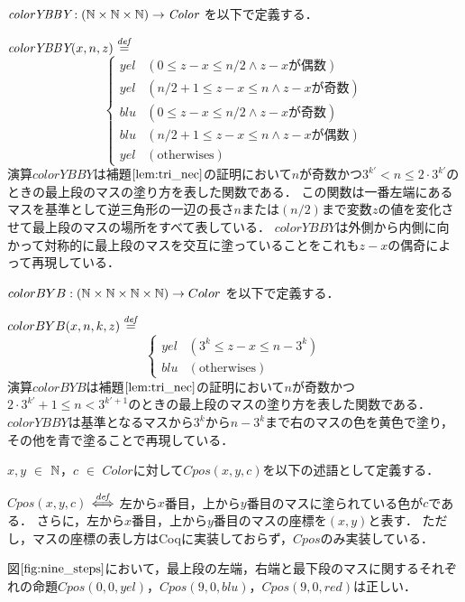 \begin{dfn}[$\colorYBBY$]
  $\textit{colorYBBY} : (\mathbb{N} \times \mathbb{N} \times \mathbb{N}) \to \textit{Color}$ を以下で定義する．

  $\textit{colorYBBY}(x,n,z) \overset{{\it def}}{=}$
  \[
  \begin{cases}
    yel & (0 \leq z-x \leq n/2 \land z-x\text{が偶数}) \\
    yel & (n/2+1 \leq z-x \leq n \land z-x\text{が奇数}) \\
    blu & (0 \leq z-x \leq n/2 \land z-x\text{が奇数}) \\
    blu & (n/2+1 \leq z-x \leq n \land z-x\text{が偶数}) \\
    yel & (\text{otherwises})
  \end{cases}
  \]
  演算$colorYBBY$は補題$\ref{lem:tri_nec}$の証明において$n$が奇数かつ$3^{k'} < n \leq 2 \cdot 3^{k'}$のときの最上段のマスの塗り方を表した関数である．
  この関数は一番左端にあるマスを基準として逆三角形の一辺の長さ$n$または$(n/2)$まで変数$z$の値を変化させて最上段のマスの場所をすべて表している．
  $colorYBBY$は外側から内側に向かって対称的に最上段のマスを交互に塗っていることをこれも$z-x$の偶奇によって再現している．
\end{dfn}
\begin{dfn}[$colorBYB$]
  $colorBYB : (\mathbb{N} \times \mathbb{N} \times \mathbb{N} \times \mathbb{N} ) \to Color$ を以下で定義する．

  $colorBYB(x,n,k,z) \overset{{\it def}}{=}$
  \[
  \begin{cases}
    yel & (3^k \leq z-x \leq n-3^k) \\
    blu & (\text{otherwises})
  \end{cases}
  \]
  演算$colorBYB$は補題$\ref{lem:tri_nec}$の証明において$n$が奇数かつ$2 \cdot 3^{k'} + 1 \leq n < 3^{k'+1}$のときの最上段のマスの塗り方を表した関数である．
  $colorYBBY$は基準となるマスから$3^k$から$n-3^k$まで右のマスの色を黄色で塗り，
  その他を青で塗ることで再現している．
\end{dfn}
\begin{dfn}[$Cpos$]
  $x, y$ $\in$ $\mathbb{N}$，$c$ $\in$ $Color$に対して$Cpos(x,y,c)$を以下の述語として定義する．
  
  $Cpos(x,y,c)$ $\overset{{\it def}}{\Longleftrightarrow}$
  左から$x$番目，上から$y$番目のマスに塗られている色が$c$である．
  さらに，左から$x$番目，上から$y$番目のマスの座標を$(x,y)$と表す．
  ただし，マスの座標の表し方はCoqに実装しておらず，$Cpos$のみ実装している．
\end{dfn}
\begin{exm}
  図$\ref{fig:nine_steps}$において，最上段の左端，右端と最下段のマスに関するそれぞれの命題$Cpos(0,0,yel)$，$Cpos(9,0,blu)$，$Cpos(9,0,red)$は正しい．
\end{exm}
